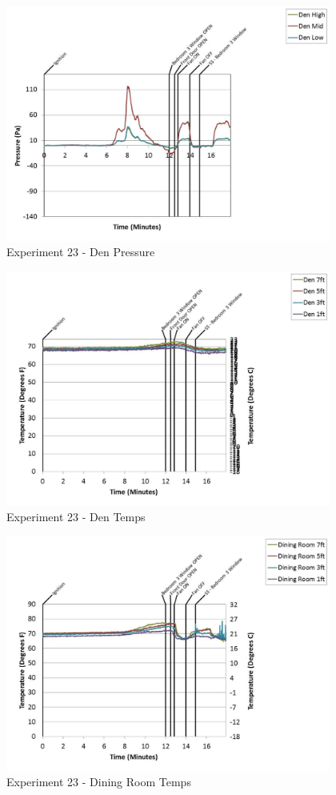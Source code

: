 \documentclass{article}
\begin{document}
\begin{appendices}
	\begin{figure}[h!]
		\centering
		\includegraphics[height=3.05in]{0_Images/Results_Charts/Exp_23_Charts/DenPressure.pdf}
		\caption{Experiment 23 - Den Pressure}
	\end{figure}
 
	\clearpage

	\begin{figure}[h!]
		\centering
		\includegraphics[height=3.05in]{0_Images/Results_Charts/Exp_23_Charts/DenTemps.pdf}
		\caption{Experiment 23 - Den Temps}
	\end{figure}
 

	\begin{figure}[h!]
		\centering
		\includegraphics[height=3.05in]{0_Images/Results_Charts/Exp_23_Charts/DiningRoomTemps.pdf}
		\caption{Experiment 23 - Dining Room Temps}
	\end{figure}
 

\end{appendices}
\end{document}
